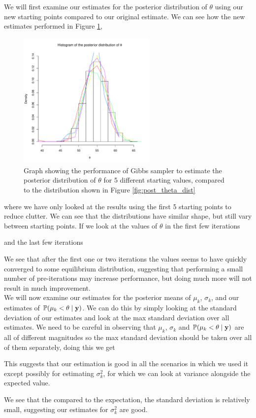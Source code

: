 \documentclass[11pt]{article} %
\let\originalleft\left
\let\originalright\right
\renewcommand{\left}{\mathopen{}\mathclose\bgroup\originalleft}
\renewcommand{\right}{\aftergroup\egroup\originalright}
\begin{document}
We will first examine our estimates for the posterior distribution of $\theta$ using our new starting points compared to our original estimate. We can see how the new estimates performed in Figure \ref{fig:post_theta_dist_conv},
\begin{figure}[h]
	\centering
	\includegraphics[width=0.6\textwidth]{"../R File/theta_dist_conv"}	
	\caption{Graph showing the performance of Gibbs sampler to estimate the posterior distribution of $\theta$ for 5 different starting values, compared to the distribution shown in Figure \ref{fig:post_theta_dist}}
	\label{fig:post_theta_dist_conv}
\end{figure} where we have only looked at the results using the first 5 starting points to reduce clutter. We can see that the distributions have similar shape, but still vary between starting points. If we look at the values of $\theta$ in the first few iterations

and the last few iterations

We see that after the first one or two iterations the values seems to have quickly converged to some equilibrium distribution, suggesting that performing a small number of pre-iterations may increase performance, but doing much more will not result in much improvement.\\

We will now examine our estimates for the posterior means of $\mu_k$, $\sigma_k$, and our estimates of $\mathbb{P}\left(\mu_k < \theta \mid \mathbf{y}\right)$. We can do this by simply looking at the standard deviation of our estimates and look at the max standard deviation over all estimates. We need to be careful in observing that $\mu_k$, $\sigma_k$ and $\mathbb{P}\left(\mu_k < \theta \mid \mathbf{y}\right)$ are all of different magnitudes so the max standard deviation should be taken over all of them separately, doing this we get

This suggests that our estimation is good in all the scenarios in which we used it except possibly for estimating $\sigma_k^2$, for which we can look at variance alongside the expected value.

We see that the compared to the expectation, the standard deviation is relatively small, suggesting our estimates for $\sigma_k^2$ are good.\\
\end{document}
